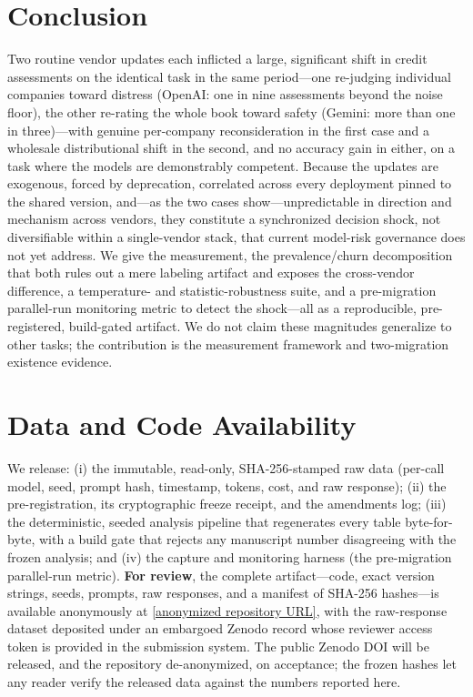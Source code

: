 \documentclass[10pt,twocolumn]{article}
\begin{document}
\section{Conclusion}
Two routine vendor updates each inflicted a large, significant shift in credit assessments on the identical task in the same period---one re-judging individual companies toward distress (OpenAI: one in nine assessments beyond the noise floor), the other re-rating the whole book toward safety (Gemini: more than one in three)---with genuine per-company reconsideration in the first case and a wholesale distributional shift in the second, and no accuracy gain in either, on a task where the models are demonstrably competent. Because the updates are exogenous, forced by deprecation, correlated across every deployment pinned to the shared version, and---as the two cases show---unpredictable in direction and mechanism across vendors, they constitute a synchronized decision shock, not diversifiable within a single-vendor stack, that current model-risk governance does not yet address. We give the measurement, the prevalence/churn decomposition that both rules out a mere labeling artifact and exposes the cross-vendor difference, a temperature- and statistic-robustness suite, and a pre-migration parallel-run monitoring metric to detect the shock---all as a reproducible, pre-registered, build-gated artifact. We do not claim these magnitudes generalize to other tasks; the contribution is the measurement framework and two-migration existence evidence.

\section*{Data and Code Availability}
We release: (i) the immutable, read-only, SHA-256-stamped raw data (per-call model, seed, prompt hash, timestamp, tokens, cost, and raw response); (ii) the pre-registration, its cryptographic freeze receipt, and the amendments log; (iii) the deterministic, seeded analysis pipeline that regenerates every table byte-for-byte, with a build gate that rejects any manuscript number disagreeing with the frozen analysis; and (iv) the capture and monitoring harness (the pre-migration parallel-run metric). \textbf{For review}, the complete artifact---code, exact version strings, seeds, prompts, raw responses, and a manifest of SHA-256 hashes---is available anonymously at \url{[anonymized repository URL]}, with the raw-response dataset deposited under an embargoed Zenodo record whose reviewer access token is provided in the submission system. The public Zenodo DOI will be released, and the repository de-anonymized, on acceptance; the frozen hashes let any reader verify the released data against the numbers reported here.
\end{document}
